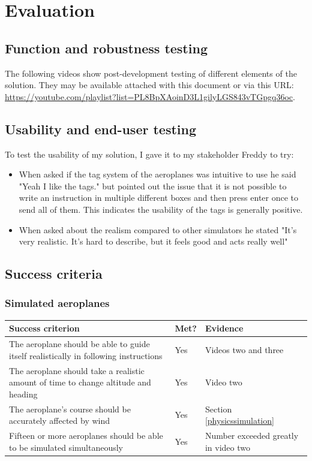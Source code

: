 \documentclass{article}
\begin{document}
\clearpage
\section{Evaluation}
\subsection{Function and robustness testing}
The following videos show post-development testing of different elements of the solution.
They may be available attached with this document or via this URL: \url{https://youtube.com/playlist?list=PL8BpXAoinD3L1gilyLGS843vTGpgq36oc}.


\subsection{Usability and end-user testing}
To test the usability of my solution, I gave it to my stakeholder Freddy to try:
\begin{itemize}
    \item When asked if the tag system of the aeroplanes was intuitive to use he said "Yeah I like the tags." but pointed out the issue that it is not possible to write an instruction in multiple different boxes and then press enter once to send all of them.
    This indicates the usability of the tags is generally positive.
    \item When asked about the realism compared to other simulators he stated "It's very realistic. It's hard to describe, but it feels good and acts really well"
\end{itemize}


\subsection{Success criteria}
\subsubsection{Simulated aeroplanes}
\begin{table}[ht]
\centering
\begin{tabular}{| p{} | p{} | p{} |}
\hline
\textbf{Success criterion} & \textbf{Met?} & \textbf{Evidence} \\
\hline
The aeroplane should be able to guide itself realistically in following instructions & Yes & Videos two and three \\
\hline
The aeroplane should take a realistic amount of time to change altitude and heading & Yes & Video two \\
\hline
The aeroplane's course should be accurately affected by wind & Yes & Section \ref{physicssimulation} \\
\hline
Fifteen or more aeroplanes should be able to be simulated simultaneously & Yes & Number exceeded greatly in video two \\
\hline
\end{tabular}
\end{table}
\end{document}
